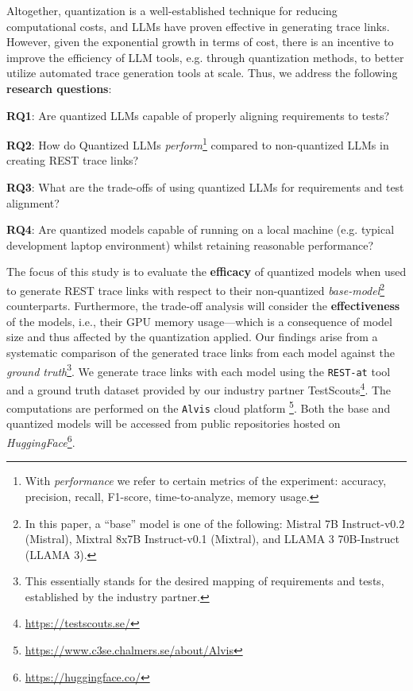 \documentclass[conference]{IEEEtran}
\begin{document}
Altogether, quantization is a well-established technique for reducing
computational costs, and LLMs have proven effective in generating trace links.
However, given the exponential growth in terms of cost, there is an incentive to
improve the efficiency of LLM tools, e.g. through quantization methods, to
better utilize automated trace generation tools at scale. Thus, we address the 
following \textbf{research questions}:

\begin{RQBox}
\noindent
\textbf{RQ1}: Are quantized LLMs capable of properly aligning requirements to tests?

\noindent
\textbf{RQ2}: How do Quantized LLMs \textit{perform}\footnote{With \textit{performance} we refer to certain metrics of the experiment: accuracy, precision, recall, F1-score, time-to-analyze, memory usage.} compared to non-quantized LLMs in creating REST trace links?

\noindent
\textbf{RQ3}: What are the trade-offs of using quantized LLMs for requirements and test alignment?

\noindent
\textbf{RQ4}: Are quantized models capable of running on a local machine (e.g. typical development laptop environment) whilst retaining reasonable performance?


\end{RQBox}

The focus of this study is to evaluate the \textbf{efficacy} of quantized models
when used to generate REST trace links with respect to their non-quantized
\textit{base-model}\footnote{In this paper, a ``base'' model is one of the
following: Mistral 7B Instruct-v0.2 (Mistral), Mixtral 8x7B Instruct-v0.1
(Mixtral), and LLAMA 3 70B-Instruct (LLAMA 3).} counterparts. Furthermore, the
trade-off analysis will consider the \textbf{effectiveness} of the models, i.e.,
their GPU memory usage---which is a consequence of model size and thus affected
by the quantization applied. Our findings arise from a systematic comparison of
the  generated trace links from each model against the \textit{ground
truth}\footnote{This essentially stands for the desired mapping of requirements
and tests, established by the industry partner.}. We generate trace links with
each model using the \verb|REST-at| tool and a ground truth dataset provided by
our industry partner TestScouts\footnote{\url{https://testscouts.se/}}. The
computations are performed on the \verb|Alvis| cloud platform
\footnote{\url{https://www.c3se.chalmers.se/about/Alvis}}. Both the base and
quantized models will be accessed from public repositories hosted on
\textit{HuggingFace}\footnote{\url{https://huggingface.co/}}.
\end{document}
